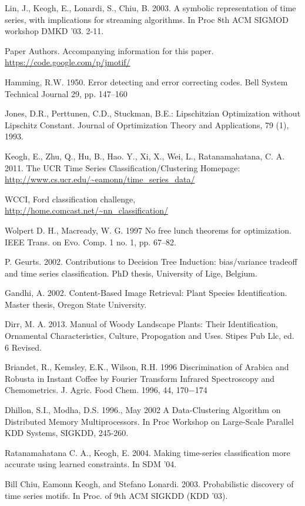 \documentclass{llncs}
\begin{document}
\begin{thebibliography}{5}
Lin, J., Keogh, E., Lonardi, S., Chiu, B. 2003.
A symbolic representation of time series, with implications for streaming algorithms. 
In Proc 8th ACM SIGMOD workshop DMKD '03. 2-11.

Paper Authors. 
Accompanying information for this paper. 
\url{https://code.google.com/p/jmotif/}

Hamming, R.W. 1950.
Error detecting and error correcting codes. 
Bell System Technical Journal 29, pp. 147--160

Jones, D.R., Perttunen, C.D., Stuckman, B.E.:
Lipschitzian Optimization without Lipschitz Constant.
Journal of Oprtimization Theory and Applications, 79 (1), 1993.

Keogh, E., Zhu, Q., Hu, B., Hao. Y.,  Xi, X., Wei, L., Ratanamahatana, C. A. 2011.
The UCR Time Series Classification/Clustering Homepage:
\url{http://www.cs.ucr.edu/~eamonn/time_series_data/}

WCCI, Ford classification challenge, \url{http://home.comcast.net/~nn_classification/}

Wolpert D. H., Macready, W. G. 1997
No free lunch theorems for optimization.
IEEE Trans. on Evo. Comp. 1 no. 1, pp. 67--82.

P. Geurts. 2002.
Contributions to Decision Tree Induction: bias/variance tradeoﬀ and time series classiﬁcation.
PhD thesis, University of Lige, Belgium.

Gandhi, A. 2002.
Content-Based Image Retrieval: Plant Species Identification. 
Master thesis, Oregon State University.

Dirr, M. A. 2013.
Manual of Woody Landscape Plants: Their Identification, Ornamental Characteristics,
Culture, Propogation and Uses.
Stipes Pub Llc, ed. 6 Revised.

Briandet, R., Kemsley, E.K., Wilson, R.H. 1996
Discrimination of Arabica and Robusta in Instant Coffee by Fourier Transform Infrared Spectroscopy
and Chemometrics.
J. Agric. Food Chem. 1996, 44, 170−174

Dhillon, S.I., Modha, D.S. 1996., May 2002
A Data-Clustering Algorithm on Distributed Memory Multiprocessors. 
In Proc Workshop on Large-Scale Parallel KDD Systems, SIGKDD, 245-260.

Ratanamahatana C. A., Keogh, E. 2004.
Making time-series classification more accurate using learned constraints. 
In SDM '04.

Bill Chiu, Eamonn Keogh, and Stefano Lonardi. 2003. 
Probabilistic discovery of time series motifs. 
In Proc. of  9th ACM SIGKDD (KDD '03).


\end{thebibliography}

%
\end{document}
